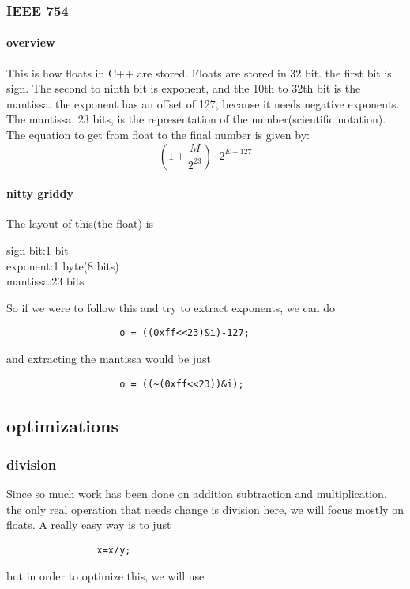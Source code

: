 \documentclass{article} %
\begin{document}
        \subsubsection{IEEE 754}
            \paragraph{overview}
                This is how floats in C++ are stored. Floats are stored in 32 bit. the first bit is sign.
                The second to ninth bit is exponent, and the 10th to 32th bit is the mantissa. the exponent has
                an offset of 127, because it needs negative exponents. The mantissa, 23 bits, is the representation of the number(scientific notation).
                The equation to get from float to the final number is given by:
                \begin{equation}
                    (1+\dfrac{M}{2^{23}})\cdot2^{E-127}
                \end{equation}
            \paragraph{nitty griddy}
                The layout of this(the float) is 
                \begin{center}
                    sign bit:1 bit\\
                    exponent:1 byte(8 bits)\\
                    mantissa:23 bits\\
                \end{center}
                So if we were to follow this and try to extract exponents, we can do
                \begin{verbatim}
                    o = ((0xff<<23)&i)-127;
                \end{verbatim}
                and extracting the mantissa would be just 
                \begin{verbatim}
                    o = ((~(0xff<<23))&i);
                \end{verbatim}
    \subsection{optimizations}
        \subsubsection{division}
            Since so much work has been done on addition subtraction and multiplication, the only real operation that needs change is division
            here, we will focus mostly on floats. A really easy way is to just \begin{verbatim}
                x=x/y;
            \end{verbatim}
            but in order to optimize this, we will use 
\end{document}
